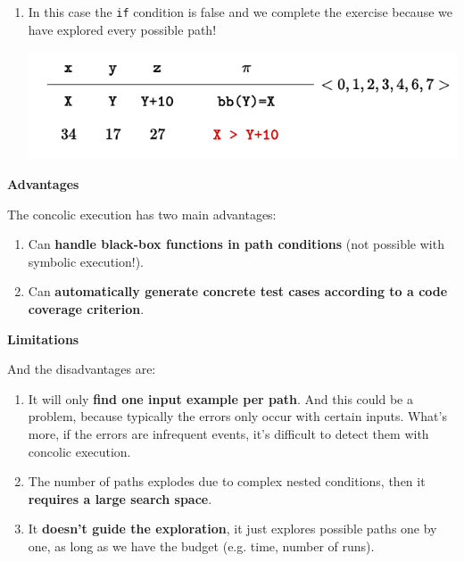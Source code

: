 \begin{examplebox}
\begin{enumerate}
        \item In this case the \texttt{if} condition is false and we complete the exercise because we have explored every possible path!
        \begin{center}
            \includegraphics[width=.8\textwidth]{img/concolic-execution-13.pdf}
        \end{center}
    \end{enumerate}
\end{examplebox}

\begin{flushleft}
    \textcolor{Green3}{ \textbf{Advantages}}
\end{flushleft}
The concolic execution has two main advantages:
\begin{enumerate}
    \item Can \textbf{handle black-box functions in path conditions} (not possible with symbolic execution!).
    \item Can \textbf{automatically generate concrete test cases according to a code coverage criterion}.
\end{enumerate}

\begin{flushleft}
    \textcolor{Red2}{ \textbf{Limitations}}
\end{flushleft}
And the disadvantages are:
\begin{enumerate}
    \item It will only \textbf{find one input example per path}. And this could be a problem, because typically the errors only occur with certain inputs. What's more, if the errors are infrequent events, it's difficult to detect them with concolic execution.
    
    \item The number of paths explodes due to complex nested conditions, then it \textbf{requires a large search space}.

    \item It \textbf{doesn't guide the exploration}, it just explores possible paths one by one, as long as we have the budget (e.g. time, number of runs).
\end{enumerate}

